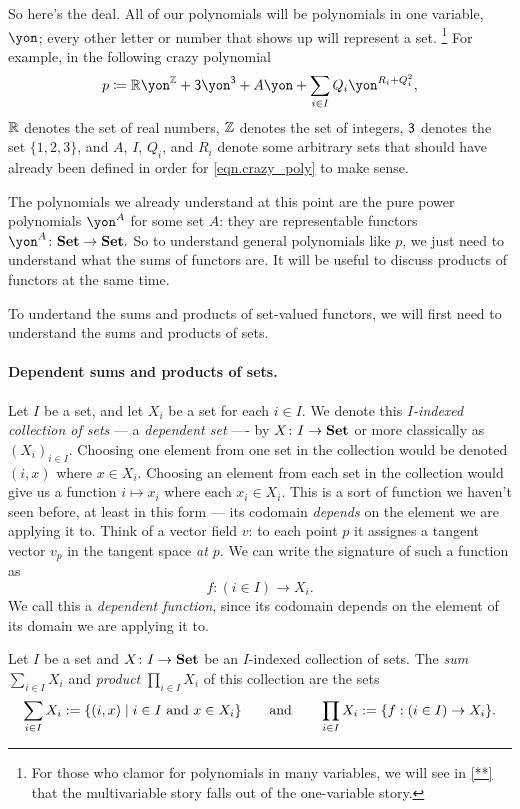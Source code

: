 \documentclass[Book-Poly]{subfiles}
\begin{document}
So here's the deal. All of our polynomials will be polynomials in one variable, $\yon$; every other letter or number that shows up will represent a set.%
\footnote{For those who clamor for polynomials in many variables, we will see in \cref{**} that the multivariable story falls out of the one-variable story.}
For example, in the following crazy polynomial
\begin{equation}\label{eqn.crazy_poly}
p\coloneqq\rr\yon^\zz+\3\yon^{\3}+A\yon+\sum_{i\in I}Q_i\yon^{R_i+Q_i^2},
\end{equation}
$\mathbb{R}$ denotes the set of real numbers, $\mathbb{Z}$ denotes the set of integers, $\textsf{3}$ denotes the set $\{1,2,3\}$, and $A$, $I$, $Q_i$, and $R_i$ denote some arbitrary sets that should have already been defined in order for \eqref{eqn.crazy_poly} to make sense.

The polynomials we already understand at this point are the pure power polynomials $\yon^A$ for some set $A$: they are representable functors $\yon^A\colon\smset\to\smset.$
So to understand general polynomials like $p$, we just need to understand what the sums of functors are. It will be useful to discuss products of functors at the same time.

To undertand the sums and products of set-valued functors, we will first need to understand the sums and products of sets.

\paragraph{Dependent sums and products of sets.}

Let $I$ be a set, and let $X_i$ be a set for each $i\in I$. We denote this
\emph{$I$-indexed collection of sets} --- a \emph{dependent set} ---- by $X\colon I\to\textbf{Set}$ or more
classically as $(X_i)_{i\in I}$. Choosing one element from one set in the collection would be denoted $(i,x)$ where $x\in X_i$. Choosing an element from
each set in the collection would give us a function $i \mapsto x_i$ where each
$x_i\in X_i$. This is a sort of function we haven't seen before, at least in
this form --- its codomain \emph{depends} on the element we are applying it to.
Think of a vector field $v$: to each point $p$ it assignes a tangent vector
$v_p$ in the tangent space \emph{at $p$}. We can write the signature of such a
function as
$$f : (i \in I) \to X_i.$$
We call this a \emph{dependent function}, since its codomain depends on the
element of its domain we are applying it to.

\begin{definition}
Let $I$ be a set and $X\colon I\to\textbf{Set}$ be an $I$-indexed collection of sets. The \emph{sum} $\sum_{i\in I}X_i$ and \emph{product} $\prod_{i\in I}X_i$ of this collection are the sets
\[
\sum_{i\in I}X_i:=\{(i,x)\mid i\in I\text{ and }x\in X_i\}
\qquad\text{and}\qquad
\prod_{i\in I}X_i:=\{f : (i \in I) \to X_i\}.
\]
\end{definition}
\end{document}
